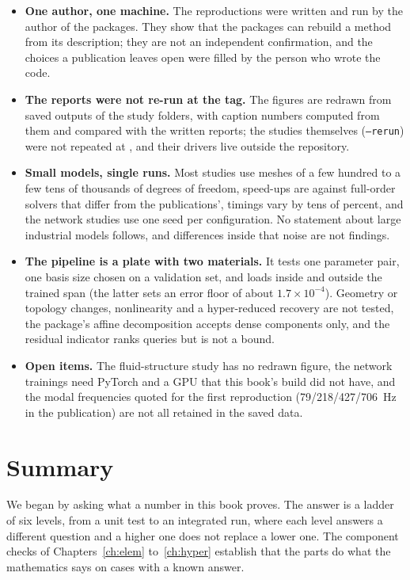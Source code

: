 \begin{limitsbox}
\begin{itemize}
\item \textbf{One author, one machine.} The reproductions were written and run by the author of the packages. They show that the packages can rebuild a method from its description; they are not an independent confirmation, and the choices a publication leaves open were filled by the person who wrote the code.
\item \textbf{The reports were not re-run at the tag.} The figures are redrawn from saved outputs of the study folders, with caption numbers computed from them and compared with the written reports; the studies themselves (\texttt{--rerun}) were not repeated at \booktag{}, and their drivers live outside the repository.
\item \textbf{Small models, single runs.} Most studies use meshes of a few hundred to a few tens of thousands of degrees of freedom, speed-ups are against full-order solvers that differ from the publications', timings vary by tens of percent, and the network studies use one seed per configuration. No statement about large industrial models follows, and differences inside that noise are not findings.
\item \textbf{The pipeline is a plate with two materials.} It tests one parameter pair, one basis size chosen on a validation set, and loads inside and outside the trained span (the latter sets an error floor of about $1.7\times10^{-4}$). Geometry or topology changes, nonlinearity and a hyper-reduced recovery are not tested, the package's affine decomposition accepts dense components only, and the residual indicator ranks queries but is not a bound.
\item \textbf{Open items.} The fluid-structure study has no redrawn figure, the network trainings need PyTorch and a GPU that this book's build did not have, and the modal frequencies quoted for the first reproduction (79/218/427/706~Hz in the publication) are not all retained in the saved data.
\end{itemize}
\end{limitsbox}

\section{Summary}\label{sec:vf-summary}

We began by asking what a number in this book proves. The answer is a ladder of six levels, from a unit test to an integrated run, where each level answers a different question and a higher one does not replace a lower one. The component checks of Chapters~\ref{ch:elem} to~\ref{ch:hyper} establish that the parts do what the mathematics says on cases with a known answer.

